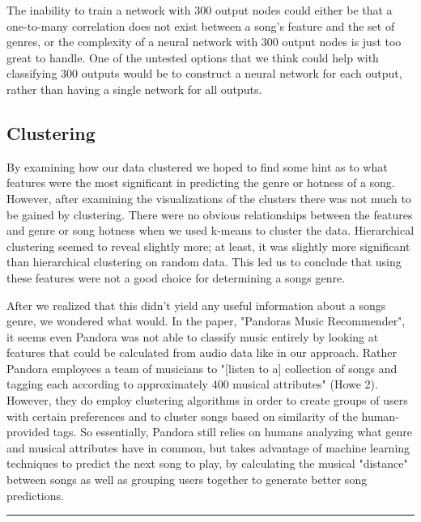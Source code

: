 \documentclass[12pt]{article}
\newcommand{\horizontalLine}{
	\begin{center}
		\hrule width 1.0\textwidth
	\end{center}
}
\begin{document}
The inability to train a network with 300 output nodes could either be that a one-to-many correlation does not exist between a song's feature and the set of genres, or the complexity of a neural network with 300 output nodes is just too great to handle. One of the untested options that we think could help with classifying 300 outputs would be to construct a neural network for each output, rather than having a single network for all outputs. 
\subsection{Clustering}
\label{subsec:clusteringDisc}
By examining how our data clustered we hoped to find some hint as to what features were the most significant in predicting the genre or hotness of a song.
However, after examining the visualizations of the clusters there was not much to be gained by clustering. There were no obvious relationships between
the features and genre or song hotness when we used k-means to cluster the data. Hierarchical clustering seemed to reveal slightly more; at least, it was slightly more significant than hierarchical clustering on random data. This led us to conclude that using these features were not a good choice for 
determining a songs genre. 

After we realized that this didn't yield any useful information about a songs genre, we wondered what would. In the paper, "Pandoras Music
Recommender", it seems even Pandora was not able to classify music entirely by looking at features that could be calculated from audio data like in 
our approach. Rather Pandora employees a team of musicians to "[listen to a] collection of songs and tagging each according to
approximately 400 musical attributes" (Howe 2). However, they do employ clustering algorithms in order to create groups of users with certain preferences and
to cluster songs based on similarity of the human-provided tags.
So essentially, Pandora still relies on humans analyzing what genre and musical attributes have in common, but takes advantage of machine learning techniques
to predict the next song to play, by calculating the musical "distance" between songs as well as grouping users together to generate better song predictions.
\horizontalLine
\end{document}
